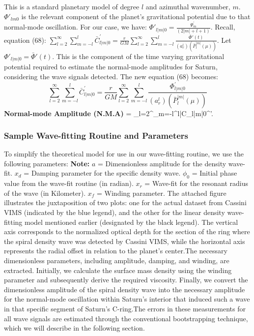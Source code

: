 \documentclass[conference]{IEEEtran}
\begin{document}
This is a standard planetary model of degree $l$ and azimuthal wavenumber, $m$. $\Phi{'}_{lm0}$ is the relevant component of the planet’s gravitational potential due to that normal-mode oscillation.
For our case, we have: $\Phi{'}_{l|m|0} = \frac{\Psi^{'}_{m}}{(2|m| + l + 1)}$. Recall, equation (68): $\sum_{l=2}^{\infty}\sum_{m=-l}^{l}\bar{C}_{l|m|0}^{'} =\frac{r}{GM} \sum_{l=2}^{\infty}\sum_{m=-l}^{l}\frac{\bar{\Phi}{'}(t)}{(a_{r}^{l})(\bar{P}_{l}^{|m|}(\mu))}$.
Let $\Phi{'}_{l|m|0} = \bar{\Phi}{'}(t)$. This is the component of the time varying gravitational potential required to estimate the normal-mode amplitudes for Saturn, considering the wave signals detected.
The new equation (68) becomes:
\begin{equation}
\sum_{l=2}^{\infty}\sum_{m=-l}^{l}\bar{C}_{l|m|0}^{'} =\frac{r}{GM} \sum_{l=2}^{\infty}\sum_{m=-l}^{l}\frac{{\Phi}^{'}_{l|m|0}}{(a_{r}^{l})(\bar{P}_{l}^{|m|}(\mu))}
\end{equation}
\textbf{Normal-mode Amplitude (N.M.A)} = \sum_{l=2}^{\infty}\sum_{m=-l}^{l}\bar{C}_{l|m|0}^{'}.


\subsubsection{Sample Wave-fitting Routine and Parameters}
To simplify the theoretical model for use in our wave-fitting routine, we use the following parameters: 
\vspace{3}
\textbf{Note:}
\vspace{3}\textbf{$a$} = Dimensionless amplitude for the density wave-fit.
\vspace{3}\textbf{$x_{d}$} = Damping parameter for the specific density wave.
\vspace{3}\textbf{$\phi_{0}$} = Initial phase value from the wave-fit routine (in radian).
\vspace{3}\textbf{$x_{r}$} = Wave-fit for the resonant radius of the wave (in Kilometer).
\vspace{3}\textbf{$x_{f}$} = Winding parameter.
\vspace{10}The attached figure illustrates the juxtaposition of two plots: one for the actual dataset from Cassini VIMS (indicated by the blue legend), and the other for the linear density wave-fitting model mentioned earlier (designated by the black legend). The vertical axis corresponds to the normalized optical depth for the section of the ring where the spiral density wave was detected by Cassini VIMS, while the horizontal axis represents the radial offset in relation to the planet's center.The necessary dimensionless parameters, including amplitude, damping, and winding, are extracted. Initially, we calculate the surface mass density using the winding parameter and subsequently derive the required viscosity. Finally, we convert the dimensionless amplitude of the spiral density wave into the necessary amplitude for the normal-mode oscillation within Saturn's interior that induced such a wave in that specific segment of Saturn's C-ring.The errors in these measurements for all wave signals are estimated through the conventional bootstrapping technique, which we will describe in the following section.
\end{document}
